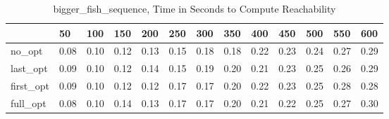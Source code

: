 \begin{table}
\caption{bigger\_fish\_sequence, Time in Seconds to Compute Reachability}
\label{bigger_fish_sequence_states_time}
\begin{tabular}{lllllllllllll}
\toprule
 & 50 & 100 & 150 & 200 & 250 & 300 & 350 & 400 & 450 & 500 & 550 & 600 \\
\midrule
no\_opt & 0.08 & 0.10 & 0.12 & 0.13 & 0.15 & 0.18 & 0.18 & 0.22 & 0.23 & 0.24 & 0.27 & 0.29 \\
last\_opt & 0.09 & 0.10 & 0.12 & 0.14 & 0.15 & 0.19 & 0.20 & 0.21 & 0.23 & 0.25 & 0.26 & 0.29 \\
first\_opt & 0.09 & 0.10 & 0.12 & 0.12 & 0.17 & 0.17 & 0.20 & 0.22 & 0.23 & 0.25 & 0.28 & 0.28 \\
full\_opt & 0.08 & 0.10 & 0.14 & 0.13 & 0.17 & 0.17 & 0.20 & 0.21 & 0.22 & 0.25 & 0.27 & 0.30 \\
\bottomrule
\end{tabular}
\end{table}
